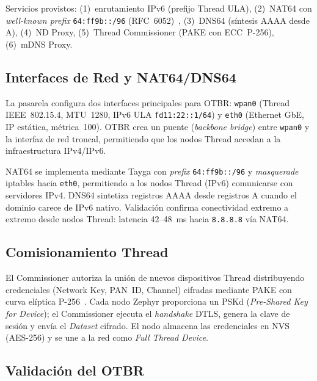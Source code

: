 Servicios provistos: (1)~enrutamiento IPv6 (prefijo Thread ULA), (2)~NAT64 con \emph{well-known prefix} \texttt{64:ff9b::/96} (RFC~6052)~\cite{RFC6052}, (3)~DNS64 (síntesis AAAA desde A), (4)~ND Proxy, (5)~Thread Commissioner (PAKE con ECC~P-256), (6)~mDNS Proxy.

\subsection{Interfaces de Red y NAT64/DNS64}
\label{sec:gateway-otbr-interfaces}

La pasarela configura dos interfaces principales para OTBR: \texttt{wpan0} (Thread IEEE~802.15.4, MTU~1280, IPv6 ULA \texttt{fd11:22::1/64}) y \texttt{eth0} (Ethernet GbE, IP estática, métrica~100).  OTBR crea un puente (\emph{backbone bridge}) entre \texttt{wpan0} y la interfaz de red troncal, permitiendo que los nodos Thread accedan a la infraestructura IPv4/IPv6.

NAT64 se implementa mediante Tayga con \emph{prefix} \texttt{64:ff9b::/96} y \emph{masquerade} iptables hacia \texttt{eth0}, permitiendo a los nodos Thread (IPv6) comunicarse con servidores IPv4.  DNS64 sintetiza registros AAAA desde registros A cuando el dominio carece de IPv6 nativo.  Validación confirma conectividad extremo a extremo desde nodos Thread: latencia 42--48~ms hacia \texttt{8.8.8.8} vía NAT64.

\subsection{Comisionamiento Thread}
\label{sec:gateway-otbr-commissioner}

El Commissioner autoriza la unión de nuevos dispositivos Thread distribuyendo credenciales (Network Key, PAN~ID, Channel) cifradas mediante PAKE con curva elíptica P-256~\cite{ThreadGroup1-4-0}.  Cada nodo Zephyr proporciona un PSKd (\emph{Pre-Shared Key for Device}); el Commissioner ejecuta el \emph{handshake} DTLS, genera la clave de sesión y envía el \emph{Dataset} cifrado.  El nodo almacena las credenciales en NVS (AES-256) y se une a la red como \emph{Full Thread Device}.

\subsection{Validación del OTBR}
\label{sec:gateway-otbr-validacion}

